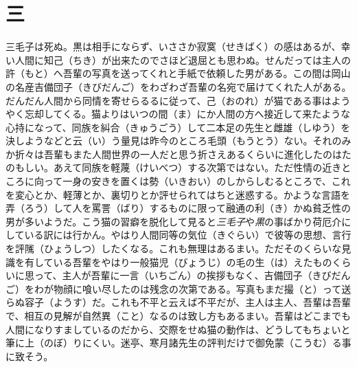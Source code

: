 \documentclass{book}
\begin{document}
\chapter*{三}
三毛子は死ぬ。黒は相手にならず、いささか寂寞（せきばく）の感はあるが、幸い人間に知己（ちき）が出来たのでさほど退屈とも思わぬ。せんだっては主人の許（もと）へ吾輩の写真を送ってくれと手紙で依頼した男がある。この間は岡山の名産吉備団子（きびだんご）をわざわざ吾輩の名宛で届けてくれた人がある。だんだん人間から同情を寄せらるるに従って、己（おのれ）が猫である事はようやく忘却してくる。猫よりはいつの間（ま）にか人間の方へ接近して来たような心持になって、同族を糾合（きゅうごう）して二本足の先生と雌雄（しゆう）を決しようなどと云（い）う量見は昨今のところ毛頭（もうとう）ない。それのみか折々は吾輩もまた人間世界の一人だと思う折さえあるくらいに進化したのはたのもしい。あえて同族を軽蔑（けいべつ）する次第ではない。ただ性情の近きところに向って一身の安きを置くは勢（いきおい）のしからしむるところで、これを変心とか、軽薄とか、裏切りとか評せられてはちと迷惑する。かような言語を弄（ろう）して人を罵詈（ばり）するものに限って融通の利（き）かぬ貧乏性の男が多いようだ。こう猫の習癖を脱化して見ると\emph{三毛子}や\emph{黒}の事ばかり荷厄介にしている訳には行かん。やはり人間同等の気位（きぐらい）で彼等の思想、言行を評隲（ひょうしつ）したくなる。これも無理はあるまい。ただそのくらいな見識を有している吾輩をやはり一般猫児（びょうじ）の毛の生（は）えたものくらいに思って、主人が吾輩に一言（いちごん）の挨拶もなく、吉備団子（きびだんご）をわが物顔に喰い尽したのは残念の次第である。写真もまだ撮（と）って送らぬ容子（ようす）だ。これも不平と云えば不平だが、主人は主人、吾輩は吾輩で、相互の見解が自然異（こと）なるのは致し方もあるまい。吾輩はどこまでも人間になりすましているのだから、交際をせぬ猫の動作は、どうしてもちょいと筆に上（のぼ）りにくい。迷亭、寒月諸先生の評判だけで御免蒙（こうむ）る事に致そう。
\end{document}
